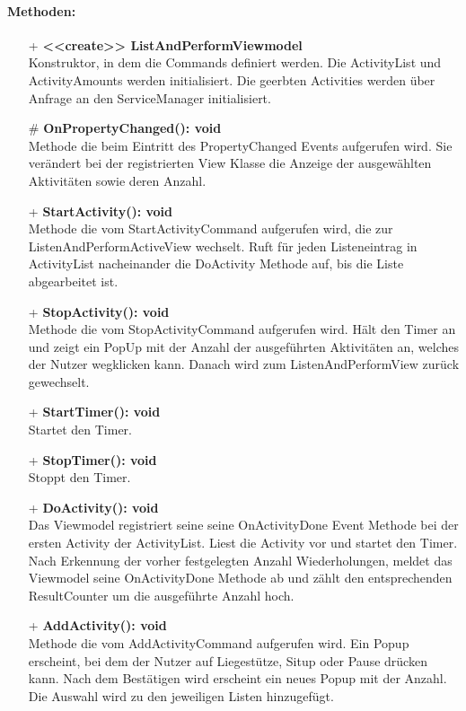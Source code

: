\documentclass[a4paper,12pt]{article}
\begin{document}
\paragraph{Methoden:}
\begin{itemize}
	\item[+] \textbf{<<create>> ListAndPerformViewmodel} \\ Konstruktor, in dem die Commands definiert werden. Die ActivityList und ActivityAmounts werden initialisiert. Die geerbten Activities werden über Anfrage an den ServiceManager initialisiert.
	\item[\#] \textbf{OnPropertyChanged(): void} \\ Methode die beim Eintritt des PropertyChanged Events aufgerufen wird. Sie verändert bei der registrierten View Klasse die Anzeige der ausgewählten Aktivitäten sowie deren Anzahl. 
	\item[+] \textbf{StartActivity(): void} \\ Methode die vom StartActivityCommand aufgerufen wird, die zur ListenAndPerformActiveView wechselt. Ruft für jeden Listeneintrag in ActivityList nacheinander die DoActivity Methode auf, bis die Liste abgearbeitet ist. 
	\item[+] \textbf{StopActivity(): void} \\ Methode die vom StopActivityCommand aufgerufen wird. Hält den Timer an und zeigt ein PopUp mit der Anzahl der ausgeführten Aktivitäten an, welches der Nutzer wegklicken kann. Danach wird zum ListenAndPerformView zurück gewechselt. 
	\item[+] \textbf{StartTimer(): void} \\ Startet den Timer. 
	\item[+] \textbf{StopTimer(): void} \\ Stoppt den Timer. 
	\item[+] \textbf{DoActivity(): void} \\ Das Viewmodel registriert seine seine OnActivityDone Event Methode bei der ersten Activity der ActivityList. Liest die Activity vor und startet den Timer. Nach Erkennung der vorher festgelegten Anzahl Wiederholungen, meldet das Viewmodel seine OnActivityDone Methode ab und zählt den entsprechenden ResultCounter um die ausgeführte Anzahl hoch. 
	\item[+] \textbf{ AddActivity(): void} \\  Methode die vom AddActivityCommand aufgerufen wird. Ein Popup erscheint, bei dem der Nutzer auf Liegestütze, Situp oder Pause drücken kann. Nach dem Bestätigen wird erscheint ein neues Popup mit der Anzahl. Die Auswahl wird zu den jeweiligen Listen hinzugefügt. 

\end{itemize}
\end{document}
